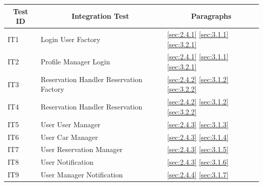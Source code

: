 \documentclass{article}
\begin{document}
		\pagebreak
			\begin{center}
				\renewcommand{\arraystretch}{1.4}
				\begin{tabular}{ l | p{7cm} | p{4cm} }\hline
					\multicolumn{1}{c|}{\textbf{Test ID}} & \multicolumn{1}{|c|}{\textbf{Integration Test}} & \multicolumn{1}{|c}{\textbf{Paragraphs}}\\\hline
					IT1 & Login \textrightarrow User Factory & \ref{sec:2.4.1} \hspace{20pt} \ref{sec:3.1.1} \hspace{20pt} \ref{sec:3.2.1}\\\hline
					IT2 & Profile Manager \textrightarrow Login & \ref{sec:2.4.1} \hspace{20pt} \ref{sec:3.1.1} \hspace{20pt} \ref{sec:3.2.1}\\\hline
					IT3 & Reservation Handler \textrightarrow Reservation Factory & \ref{sec:2.4.2} \hspace{20pt} \ref{sec:3.1.2} \hspace{20pt} \ref{sec:3.2.2}\\\hline
					IT4 & Reservation Handler \textrightarrow Reservation & \ref{sec:2.4.2} \hspace{20pt} \ref{sec:3.1.2} \hspace{20pt} \ref{sec:3.2.2}\\\hline
					IT5 & User \textrightarrow User Manager & \ref{sec:2.4.3} \hspace{20pt} \ref{sec:3.1.3} \hspace{20pt}\\\hline
					IT6 & User \textrightarrow Car Manager & \ref{sec:2.4.3} \hspace{20pt} \ref{sec:3.1.4} \hspace{20pt}\\\hline
					IT7 & User \textrightarrow Reservation Manager & \ref{sec:2.4.3} \hspace{20pt} \ref{sec:3.1.5} \hspace{20pt}\\\hline
					IT8 & User \textrightarrow Notification & \ref{sec:2.4.3} \hspace{20pt} \ref{sec:3.1.6} \hspace{20pt}\\\hline
					IT9 & User Manager \textrightarrow Notification & \ref{sec:2.4.4} \hspace{20pt} \ref{sec:3.1.7} \hspace{20pt}\\\hline

\end{tabular}
\end{center}
\end{document}
